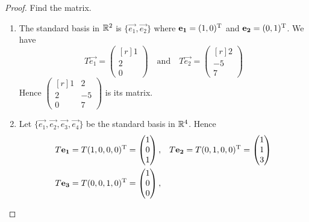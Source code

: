 \documentclass{article}
\begin{document}
\begin{proof}
  Find the matrix.
  \begin{enumerate}
    \item The standard basis in $\R^2$ is $\{\vec{e_1},\vec{e_2}\}$ where
      $\mathbf{e_1}=(1,0)^\mathrm{T}$ and $\mathbf{e_2}=(0,1)^\mathrm{T}$. We have
      \[
        T\vec{e_1}= \begin{pmatrix*}[r] 1\\2\\0 \end{pmatrix*}
        \quad\text{and}\quad
        T\vec{e_2}= \begin{pmatrix*}[r] 2\\-5\\7 \end{pmatrix*}
      \]
      Hence
      $
        \begin{pmatrix*}[r]
          1&2\\
          2&-5\\
          0&7
        \end{pmatrix*}
      $ is its matrix.
    \item Let $\{\vec{e_1},\vec{e_2},\vec{e_3},\vec{e_4}\}$ be the standard 
      basis in $\R^4$. Hence
      \begin{align*}
        &T\vec{e_1}=T(1,0,0,0)\tran = \begin{pmatrix} 1\\0\\1 \end{pmatrix},
        &&T\vec{e_2}=T(0,1,0,0)\tran= \begin{pmatrix} 1\\1\\3 \end{pmatrix}\\
        &T\vec{e_3}=T(0,0,1,0)\tran= \begin{pmatrix} 1 \\0\\0 \end{pmatrix},

\end{align*}
\end{enumerate}
\end{proof}
\end{document}
